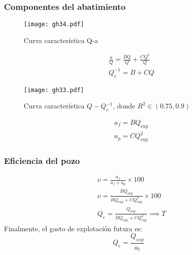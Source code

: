 \subsubsection{Componentes del abatimiento}
\begin{figure}[h!]
\centering
  \texttt{[image: gh34.pdf]}
  \caption{Curva característica Q-a}
  \label{gh34}
\end{figure}
\begin{align*}
    &\frac{a}{Q} = \frac{BQ}{Q} + \frac{CQ^2}{Q}\\
    & Q_e^{ - 1} = B + CQ
\end{align*}
\begin{figure}[h!]
\centering
  \texttt{[image: gh33.pdf]}
  \caption{Curva característica $Q-Q_e^{-1}$, donde $R^2\in (0.75,0.9)$}
  \label{gh33}
\end{figure}
\begin{align*}
    &a_f = BQ_{\exp}\\
    &a_p = CQ^2_{\exp }
\end{align*}
\subsubsection{Eficiencia del pozo}
\begin{align*}
    &\nu = \frac{a_f}{a_f +a_p }\times 100\\
    &\nu = \frac{BQ_{\exp }}{BQ_{\exp } + CQ^2_{\exp }} \times 100\\
    &Q_e = \frac{Q_{\exp }}{BQ_{\exp } + CQ^2_{\exp } }\implies T
\end{align*}
Finalmente, el gasto de explotación futura es:
\begin{equation}
    Q_e=\frac{Q_{exp}}{a_t}
\end{equation}
